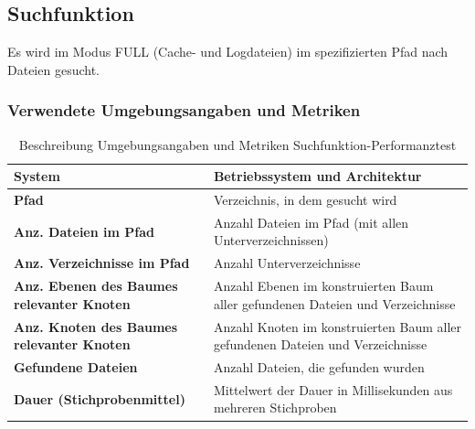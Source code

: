 \documentclass[a4paper,12pt]{report}
\begin{document}
    \subsection{Suchfunktion}\label{subsec:testduchfuhrung}
    Es wird im Modus FULL (Cache- und Logdateien) im spezifizierten Pfad nach Dateien gesucht.

    \subsubsection{Verwendete Umgebungsangaben und Metriken}\label{subsubsec:search-perftest-metrics-title}
    \begin{table}[h!]
        \centering
        \setlength{\leftmargini}{0.8cm}
        \begin{tabular}{|p{7cm}|p{7cm}|}
            \hline
            \textbf{System}                                            & Betriebssystem und Architektur                                                  \\ \hline
            \textbf{Pfad}                                              & Verzeichnis, in dem gesucht wird                                                \\ \hline
            \textbf{Anz. Dateien im Pfad}                              & Anzahl Dateien im Pfad (mit allen Unterverzeichnissen)                          \\ \hline
            \textbf{Anz. Verzeichnisse im Pfad}                        & Anzahl Unterverzeichnisse                                                       \\ \hline
            \textbf{Anz. Ebenen \newline des Baumes relevanter Knoten} & Anzahl Ebenen im konstruierten Baum aller gefundenen Dateien und Verzeichnisse \\ \hline
            \textbf{Anz. Knoten \newline des Baumes relevanter Knoten} & Anzahl Knoten im konstruierten Baum aller gefundenen Dateien und Verzeichnisse \\ \hline
            \textbf{Gefundene Dateien}                                 & Anzahl Dateien, die gefunden wurden                                             \\ \hline
            \textbf{Dauer (Stichprobenmittel)}                         & Mittelwert der Dauer in Millisekunden aus mehreren Stichproben                  \\ \hline
        \end{tabular}
        \caption{Beschreibung Umgebungsangaben und Metriken Suchfunktion-Performanztest}\label{tab:perf-search-metrics}
    \end{table}
\end{document}
